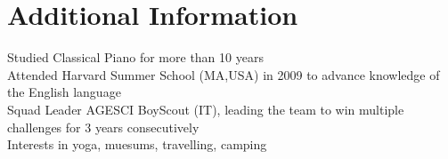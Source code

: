 \documentclass[letterpaper,11pt]{article}
\begin{document}
\section{Additional Information}
\begin{itemize}[leftmargin=0.15in, label={}]
   \small{\item{
    {Studied Classical Piano for more than 10 years} \\
    {Attended Harvard Summer School (MA,USA) in 2009 to advance knowledge of the English language} \\
    {Squad Leader AGESCI BoyScout (IT), leading the team to win multiple challenges for 3 years consecutively} \\
    {Interests in yoga, muesums, travelling, camping}
   }} 
\end{itemize}
\end{document}
